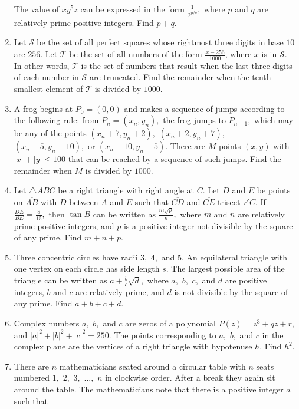 \documentclass{article}
\begin{document}
\begin{enumerate}[label=\arabic*., itemsep=0.5em]
The value of $xy^5z$ can be expressed in the form $\frac{1}{2^{p/q}},$ where $p$ and $q$ are relatively prime positive integers. Find $p+q.$\par \vspace{0.5em}\item Let $\mathcal{S}$ be the set of all perfect squares whose rightmost three digits in base $10$ are $256$. Let $\mathcal{T}$ be the set of all numbers of the form $\frac{x-256}{1000}$, where $x$ is in $\mathcal{S}$. In other words, $\mathcal{T}$ is the set of numbers that result when the last three digits of each number in $\mathcal{S}$ are truncated. Find the remainder when the tenth smallest element of $\mathcal{T}$ is divided by $1000$.\par \vspace{0.5em}\item A frog begins at $P_0 = (0,0)$ and makes a sequence of jumps according to the following rule: from $P_n = (x_n, y_n),$ the frog jumps to $P_{n+1},$ which may be any of the points $(x_n + 7, y_n + 2),$ $(x_n + 2, y_n + 7),$ $(x_n - 5, y_n - 10),$ or $(x_n - 10, y_n - 5).$ There are $M$ points $(x, y)$ with $|x| + |y| \le 100$ that can be reached by a sequence of such jumps. Find the remainder when $M$ is divided by $1000.$\par \vspace{0.5em}\item Let $\triangle ABC$ be a right triangle with right angle at $C.$ Let $D$ and $E$ be points on $\overline{AB}$ with $D$ between $A$ and $E$ such that $\overline{CD}$ and $\overline{CE}$ trisect $\angle C.$ If $\frac{DE}{BE} = \frac{8}{15},$ then $\tan B$ can be written as $\frac{m \sqrt{p}}{n},$ where $m$ and $n$ are relatively prime positive integers, and $p$ is a positive integer not divisible by the square of any prime. Find $m+n+p.$\par \vspace{0.5em}\item Three concentric circles have radii $3,$ $4,$ and $5.$ An equilateral triangle with one vertex on each circle has side length $s.$ The largest possible area of the triangle can be written as $a + \tfrac{b}{c} \sqrt{d},$ where $a,$ $b,$ $c,$ and $d$ are positive integers, $b$ and $c$ are relatively prime, and $d$ is not divisible by the square of any prime. Find $a+b+c+d.$\par \vspace{0.5em}\item Complex numbers $a,$ $b,$ and $c$ are zeros of a polynomial $P(z) = z^3 + qz + r,$ and $|a|^2 + |b|^2 + |c|^2 = 250.$ The points corresponding to $a,$ $b,$ and $c$ in the complex plane are the vertices of a right triangle with hypotenuse $h.$ Find $h^2.$\par \vspace{0.5em}\item There are $n$ mathematicians seated around a circular table with $n$ seats numbered $1,$ $2,$ $3,$ $...,$ $n$ in clockwise order. After a break they again sit around the table. The mathematicians note that there is a positive integer $a$ such that


\end{enumerate}
\end{document}
